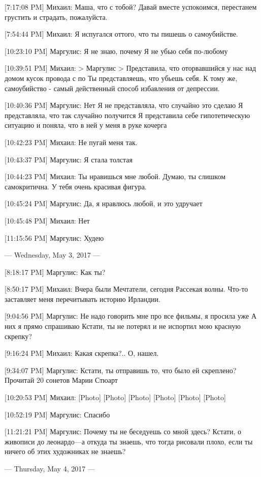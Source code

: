 \documentclass{article}
\begin{document}
[7:17:08 PM] Михаил:
Маша, что с тобой? Давай вместе успокоимся, перестанем грустить и страдать, пожалуйста.

[7:54:44 PM] Михаил:
Я испугался оттого, что ты пишешь о самоубийстве.

[10:23:10 PM] Маргулис:
Я не знаю, почему
 Я не убью себя по-любому

[10:39:51 PM] Михаил:
> Маргулис
> Представила, что оторвавшийся у нас над домом кусок провода с по
Ты представляешь, что убьешь себя. К тому же, самоубийство - самый действенный способ избавления от депрессии.

[10:40:36 PM] Маргулис:
Нет
 Я не представляла, что случайно это сделаю
 Я представляла, что так случайно получится
 Я представила себе гипотетическую ситуацию и поняла, что в ней у меня в руке кочерга

[10:42:23 PM] Михаил:
Не пугай меня так.

[10:43:37 PM] Маргулис:
Я стала толстая

[10:44:23 PM] Михаил:
Ты нравишься мне любой.
 Думаю, ты слишком самокритична.
 У тебя очень красивая фигура.

[10:45:24 PM] Маргулис:
Да, я нравлюсь любой, и это удручает

[10:45:48 PM] Михаил:
Нет

[11:15:56 PM] Маргулис:
Худею

--- Wednesday, May 3, 2017 ---

[8:18:17 PM] Маргулис:
Как ты?

[8:50:17 PM] Михаил:
Вчера были Мечтатели, сегодня Рассекая волны.
 Что-то заставляет меня перечитывать историю Ирландии.

[9:04:56 PM] Маргулис:
Не надо говорить мне про все фильмы, я просила уже
 А них я прямо спрашиваю
 Кстати, ты не потерял и не испортил мою красную скрепку?

[9:16:24 PM] Михаил:
Какая скрепка?..
 О, нашел.

[9:34:07 PM] Маргулис:
Кстати, ты отправишь то, что было ей скреплено?
 Прочитай 20 сонетов Марии Стюарт

[10:20:53 PM] Михаил:
[Photo]
 [Photo]
 [Photo]
 [Photo]
 [Photo]
 [Photo]

[10:52:19 PM] Маргулис:
Спасибо

[11:21:21 PM] Маргулис:
Почему ты не беседуешь со мной здесь?
 Кстати, о живописи до леонардо—а откуда ты знаешь, что тогда рисовали плохо, если ты ничего об этих художниках не знаешь?

--- Thursday, May 4, 2017 ---
\end{document}
